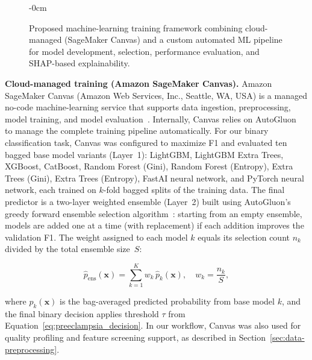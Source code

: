 \documentclass[diagnostics,article,submit,pdftex,moreauthors]{Definitions/mdpi}
\begin{document}
\begin{figure}[H]
\begin{adjustwidth}{-\extralength}{0cm}
%
        
  \end{adjustwidth}
  \caption{Proposed machine-learning training framework combining
cloud-managed (SageMaker Canvas) and a custom automated ML pipeline
for model development, selection, performance evaluation, and
SHAP-based explainability.\label{fig:training-framework}}
\end{figure}

\textbf{Cloud-managed training (Amazon SageMaker Canvas).}  Amazon
SageMaker Canvas (Amazon Web Services, Inc., Seattle, WA, USA) is a
managed no-code machine-learning service that supports data ingestion,
preprocessing, model training, and model
evaluation~\cite{aws_sagemaker_canvas_docs}.
Internally, Canvas relies on
  AutoGluon~\cite{agtabular2020} to manage the complete training
  pipeline automatically. For our binary classification task, Canvas
  was configured to maximize \ac{F1} and evaluated ten bagged base
  model variants (Layer~1): LightGBM, LightGBM Extra Trees, XGBoost,
  CatBoost, Random Forest (Gini), Random Forest (Entropy), Extra Trees
  (Gini), Extra Trees (Entropy), FastAI neural network, and PyTorch
  neural network, each trained on $k$-fold bagged splits of the
  training data. The final predictor is a two-layer weighted ensemble
  (Layer~2) built using AutoGluon's greedy forward ensemble selection
  algorithm~\cite{caruana2004ensemble}: starting from an empty
  ensemble, models are added one at a time (with replacement) if each
  addition improves the validation \ac{F1}. The weight assigned to
  each model $k$ equals its selection count $n_k$ divided by the total
  ensemble size~$S$:
\begin{linenomath}
\begin{equation}
  \hat{p}_{\mathrm{ens}}(\mathbf{x}) = \sum_{k=1}^{K} w_k\,\hat{p}_k(\mathbf{x}),
  \quad w_k = \frac{n_k}{S},
  \label{eq:ensemble-prediction}
\end{equation}
\end{linenomath}
where $\hat{p}_k(\mathbf{x})$ is the bag-averaged predicted
  probability from base model $k$, and the final binary decision applies
  threshold $\tau$ from Equation~\eqref{eq:preeclampsia_decision}.  In our
workflow, Canvas was also used for quality profiling and feature
screening support, as described in
Section~\ref{sec:data-preprocessing}.
\end{document}
